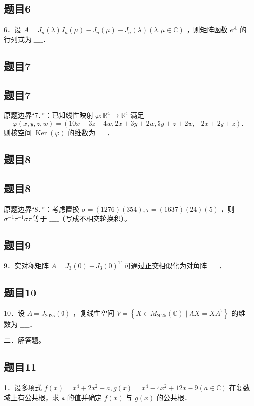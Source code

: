 \documentclass{article}
\begin{document}
\subsection{题目6}
6．设 \(A=J_{n}(\lambda) J_{n}(\mu)-J_{n}(\mu)-J_{n}(\lambda)(\lambda, \mu \in \mathbb{C})\) ，则矩阵函数 \(e^{A}\) 的行列式为 \(\_\_\_\_\)．

\begin{itemize}

\subsection{题目7}
\end{itemize}

\subsection{题目7}
原题边界“7．”：已知线性映射 \(\varphi: \mathbb{R}^{4} \rightarrow \mathbb{R}^{4}\) 满足
\[
\varphi(x, y, z, w)=(10 x-3 z+4 w, 2 x+3 y+2 w, 5 y+z+2 w,-2 x+2 y+z) .
\]
则核空间 \(\operatorname{Ker}(\varphi)\) 的维数为 \(\_\_\_\_\)．

\subsection{题目8}

\subsection{题目8}
原题边界“8．”：考虑置换 \(\sigma=(1276)(354), \tau=(1637)(24)(5)\) ，则 \(\sigma^{-1} \tau^{-1} \sigma \tau\) 等于 \(\_\_\_\_\)（写成不相交轮换积）。

\subsection{题目9}
9．实对称矩阵 \(A=J_{3}(0)+J_{3}(0)^{\mathrm{T}}\) 可通过正交相似化为对角阵 \(\_\_\_\_\)．

\subsection{题目10}
10．设 \(A=J_{2025}(0)\) ，复线性空间 \(V=\left\{X \in M_{2025}(\mathbb{C}) \mid A X=X A^{2}\right\}\) 的维数为 \(\_\_\_\_\)．

二．解答题。\\

\subsection{题目11}
1．设多项式 \(f(x)=x^{4}+2 x^{2}+a, g(x)=x^{4}-4 x^{2}+12 x-9(a \in \mathbb{C})\) 在复数域上有公共根，求 \(a\) 的值并确定 \(f(x)\) 与 \(g(x)\) 的公共根．
\end{document}
